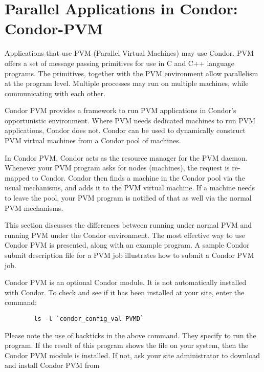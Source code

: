 \section{\label{sec:PVM}Parallel Applications in Condor: Condor-PVM}

\newcommand{\func}[1]{\texttt{#1}}

Applications that use PVM (Parallel Virtual Machines) may use
Condor.
PVM offers a set of message passing primitives for use in
C and C++ language programs.
The primitives, together with the PVM environment
allow parallelism at the program level.
Multiple processes
may run on multiple machines,
while communicating with each other.

Condor PVM provides a framework to run PVM applications
in Condor's opportunistic environment.
Where PVM needs dedicated machines
to run PVM applications, Condor does not.
Condor can be used to dynamically 
construct PVM virtual machines from a Condor pool of machines.

In Condor PVM, Condor acts as the
resource manager for the PVM daemon.  Whenever your PVM program asks
for nodes (machines), the request is re-mapped to Condor.  Condor then
finds a machine in the Condor pool via the usual mechanisms, and adds it
to the PVM virtual machine.  If a machine needs to leave the pool, your
PVM program is notified of that as well via the normal PVM mechanisms.

This section
discusses the differences between running under normal PVM
and running PVM under the Condor
environment.  The most effective way to use Condor PVM is
presented, along with an example program.
A sample Condor submit description file for a PVM job illustrates
how to submit a Condor PVM job.

\Note Condor PVM is an optional Condor module.  It is not
automatically installed with Condor. To check and see if
it has been installed at your site, enter the command:
\begin{verbatim}
        ls -l `condor_config_val PVMD`
\end{verbatim}
Please note the use of backticks in the above command.
They specify to run the  program.
If the result of this program shows the
file  on your system, then the Condor PVM module
is installed.
If not,
ask your site administrator to download and install Condor PVM from

